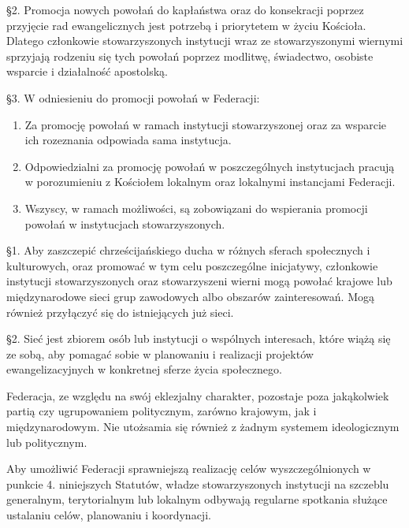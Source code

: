 \S{}2. Promocja nowych powołań do kapłaństwa oraz do konsekracji poprzez przyjęcie rad ewangelicznych jest potrzebą i priorytetem w życiu Kościoła. Dlatego członkowie stowarzyszonych instytucji wraz ze stowarzyszonymi wiernymi sprzyjają rodzeniu się tych powołań poprzez modlitwę, świadectwo, osobiste wsparcie i działalność apostolską.


\S{}3. W odniesieniu do promocji powołań w Federacji:


\begin{enumerate}


\item Za promocję powołań w ramach instytucji stowarzyszonej oraz za wsparcie ich rozeznania odpowiada sama instytucja.


\item Odpowiedzialni za promocję powołań w poszczególnych instytucjach pracują w porozumieniu z Kościołem lokalnym oraz lokalnymi instancjami Federacji.


\item Wszyscy, w ramach możliwości, są zobowiązani do wspierania promocji powołań w instytucjach stowarzyszonych.


\end{enumerate}


 
 
 \S{}1. Aby zaszczepić chrześcijańskiego ducha w różnych sferach społecznych i kulturowych, oraz promować w tym celu poszczególne inicjatywy, członkowie instytucji stowarzyszonych oraz stowarzyszeni wierni mogą powołać krajowe lub międzynarodowe sieci grup zawodowych albo obszarów zainteresowań. Mogą również przyłączyć się do istniejących już sieci.


\S{}2. Sieć jest zbiorem osób lub instytucji o wspólnych interesach, które wiążą się ze sobą, aby pomagać sobie w planowaniu i realizacji projektów ewangelizacyjnych w konkretnej sferze życia społecznego.
 
 
 Federacja, ze względu na swój eklezjalny charakter, pozostaje poza jakąkolwiek partią czy ugrupowaniem politycznym, zarówno krajowym, jak i międzynarodowym. Nie utożsamia się również z żadnym systemem ideologicznym lub politycznym.
 
 
 Aby umożliwić Federacji sprawniejszą realizację celów wyszczególnionych w punkcie 4. niniejszych Statutów, władze stowarzyszonych instytucji na szczeblu generalnym, terytorialnym lub lokalnym odbywają regularne spotkania służące ustalaniu celów, planowaniu i koordynacji.
 
